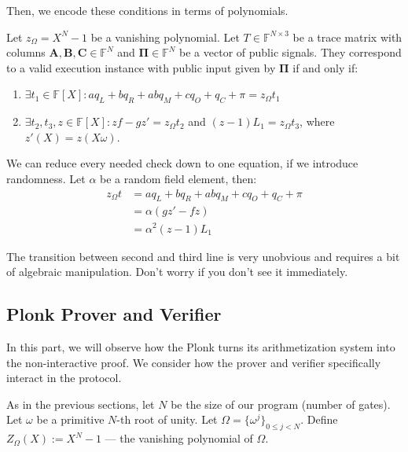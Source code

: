 \documentclass[../lecture-notes.tex]{subfiles}
\begin{document}
Then, we encode these conditions in terms of polynomials.

\begin{definition}
Let $z_{\Omega} = X^N - 1$ be a vanishing polynomial. Let $T \in \mathbb{F}^{N
\times 3}$ be a trace matrix with columns $\mathbf{A}, \mathbf{B}, \mathbf{C}
\in \mathbb{F}^N$ and $\boldsymbol{\Pi} \in \mathbb{F}^N$ be a vector of public
signals. They correspond to a valid execution instance with public input given
by $\boldsymbol{\Pi}$ if and only if:

\begin{enumerate}
    \item \(\exists t_1 \in \mathbb{F}[X]: aq_L + bq_R + abq_M + cq_O + q_C + \pi = z_{\Omega}t_1\)
    \item \(\exists t_2, t_3, z \in \mathbb{F}[X]: zf - gz' = z_{\Omega}t_2\) and \((z-1)L_1 = z_{\Omega}t_3\), where $z'(X) = z(X\omega)$.
\end{enumerate}
\end{definition}
\begin{remark}
We can reduce every needed check down to one equation, if we introduce randomness.
Let $\alpha$ be a random field element, then: 
\[
    \begin{aligned}
        z_{\Omega}t &= aq_L + bq_R + abq_M + cq_O + q_C + \pi \\
        &= \alpha(gz' - fz) \\
        &= \alpha^2(z - 1)L_1
    \end{aligned}
\]

The transition between second and third line is very unobvious and requires a 
bit of algebraic manipulation. Don't worry if you don't see it immediately.
\end{remark}


\subsection{Plonk Prover and Verifier}

In this part, we will observe how the Plonk turns its arithmetization system
into the non-interactive proof. We consider how the prover and verifier specifically interact
in the protocol.

As in the previous sections, let $N$ be the size of our program (number of
gates). Let $\omega$ be a primitive $N$-th root of unity. Let $\Omega =
\{\omega^j\}_{0 \leq j < N}$. Define $Z_{\Omega}(X) := X^N - 1$ --- the vanishing 
polynomial of $\Omega$.
\end{document}
